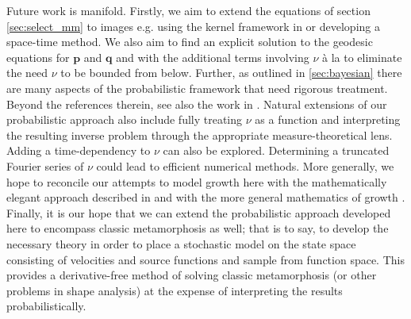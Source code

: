 \documentclass[runningheads]{llncs}
\begin{document}
Future work is manifold. Firstly, we aim to extend the equations of section
\ref{sec:select_mm} to images e.g. using the kernel framework in
\cite{richardson2016metamorphosis} or developing a space-time method. We also
aim to find an explicit solution to the geodesic equations for $\mathbf p$ and
$\mathbf q$ and with the additional terms involving $\nu$ à la
\cite{trouve2005local} to eliminate the need $\nu$ to be bounded from below.
Further, as outlined in \ref{sec:bayesian} there
are many aspects of the probabilistic framework that need rigorous treatment.
Beyond the references therein, see also the work in \cite{dashti2013map}.
Natural extensions of our probabilistic approach also include fully treating
$\nu$ as a function and interpreting the resulting inverse problem through the
appropriate measure-theoretical lens. Adding a time-dependency to $\nu$ can also
be explored. Determining a truncated Fourier series of $\nu$ could lead to
efficient numerical methods. More generally, we hope to reconcile our attempts
to model growth here with the mathematically elegant approach described in
\cite{kaltenmark2016geometrical} and with the more general mathematics of growth
\cite{goriely2017mathematics}.\\

Finally, it is our hope that we can extend the probabilistic approach developed
here to encompass classic metamorphosis as well; that is to say, to develop the
necessary theory in order to place a stochastic model on the state space
consisting of velocities and source functions and sample from function space.
This provides a derivative-free method of solving classic metamorphosis (or
other problems in shape analysis) at the expense of interpreting the results
probabilistically.




\end{document}
